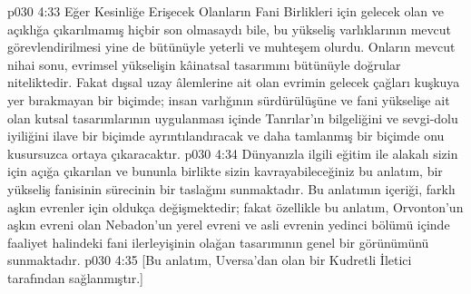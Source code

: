 \vs p030 4:33 Eğer Kesinliğe Erişecek Olanların Fani Birlikleri için gelecek olan ve açıklığa çıkarılmamış hiçbir son olmasaydı bile, bu yükseliş varlıklarının mevcut görevlendirilmesi yine de bütünüyle yeterli ve muhteşem olurdu. Onların mevcut nihai sonu, evrimsel yükselişin kâinatsal tasarımını bütünüyle doğrular niteliktedir. Fakat dışsal uzay âlemlerine ait olan evrimin gelecek çağları kuşkuya yer bırakmayan bir biçimde; insan varlığının sürdürülüşüne ve fani yükselişe ait olan kutsal tasarımlarının uygulanması içinde Tanrılar’ın bilgeliğini ve sevgi\hyp{}dolu iyiliğini ilave bir biçimde ayrıntılandıracak ve daha tamlanmış bir biçimde onu kusursuzca ortaya çıkaracaktır.
\vs p030 4:34 Dünyanızla ilgili eğitim ile alakalı sizin için açığa çıkarılan ve bununla birlikte sizin kavrayabileceğiniz bu anlatım, bir yükseliş fanisinin sürecinin bir taslağını sunmaktadır. Bu anlatımın içeriği, farklı aşkın evrenler için oldukça değişmektedir; fakat özellikle bu anlatım, Orvonton’un aşkın evreni olan Nebadon’un yerel evreni ve asli evrenin yedinci bölümü içinde faaliyet halindeki fani ilerleyişinin olağan tasarımının genel bir görünümünü sunmaktadır.
\vs p030 4:35 [Bu anlatım, Uversa’dan olan bir Kudretli İletici tarafından sağlanmıştır.]
